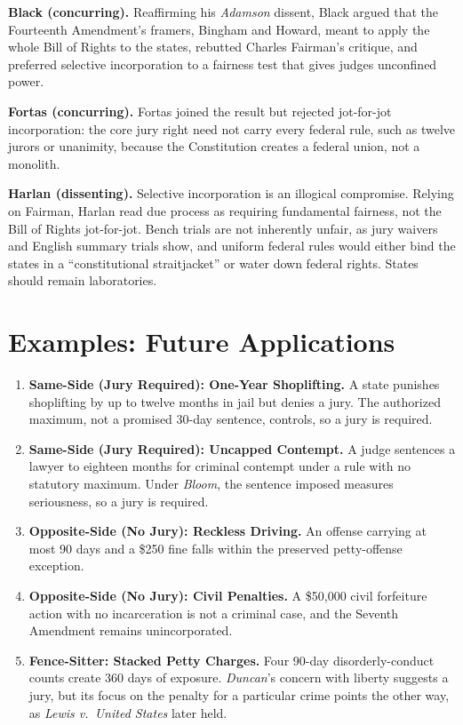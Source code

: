 \documentclass[12pt]{article}
\begin{document}
\textbf{Black (concurring).} Reaffirming his \textit{Adamson} dissent, Black argued that the Fourteenth Amendment's framers, Bingham and Howard, meant to apply the whole Bill of Rights to the states, rebutted Charles Fairman's critique, and preferred selective incorporation to a fairness test that gives judges unconfined power.

\textbf{Fortas (concurring).} Fortas joined the result but rejected jot-for-jot incorporation: the core jury right need not carry every federal rule, such as twelve jurors or unanimity, because the Constitution creates a federal union, not a monolith.

\textbf{Harlan (dissenting).} Selective incorporation is an illogical compromise. Relying on Fairman, Harlan read due process as requiring fundamental fairness, not the Bill of Rights jot-for-jot. Bench trials are not inherently unfair, as jury waivers and English summary trials show, and uniform federal rules would either bind the states in a ``constitutional straitjacket'' or water down federal rights. States should remain laboratories.

\section{Examples: Future Applications}

\begin{enumerate}
\item \textbf{Same-Side (Jury Required): One-Year Shoplifting.} A state punishes shoplifting by up to twelve months in jail but denies a jury. The authorized maximum, not a promised 30-day sentence, controls, so a jury is required.
\item \textbf{Same-Side (Jury Required): Uncapped Contempt.} A judge sentences a lawyer to eighteen months for criminal contempt under a rule with no statutory maximum. Under \textit{Bloom}, the sentence imposed measures seriousness, so a jury is required.
\item \textbf{Opposite-Side (No Jury): Reckless Driving.} An offense carrying at most 90 days and a \$250 fine falls within the preserved petty-offense exception.
\item \textbf{Opposite-Side (No Jury): Civil Penalties.} A \$50,000 civil forfeiture action with no incarceration is not a criminal case, and the Seventh Amendment remains unincorporated.
\item \textbf{Fence-Sitter: Stacked Petty Charges.} Four 90-day disorderly-conduct counts create 360 days of exposure. \textit{Duncan}'s concern with liberty suggests a jury, but its focus on the penalty for a particular crime points the other way, as \textit{Lewis v.\ United States} later held.
\end{enumerate}
\end{document}
